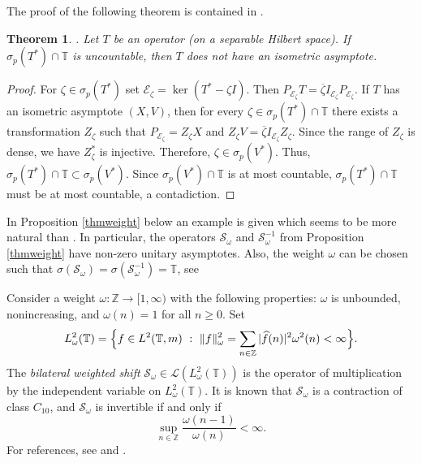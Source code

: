 \documentclass[a4paper,oneside,11pt]{amsart}
\numberwithin{equation}{section}
\theoremstyle{plain}
\newtheorem{theorem}{Theorem}[section]
\theoremstyle{definition}
\begin{document}
The proof of the following theorem  is contained in {\cite[Example 14]{kerntuple}}. 

\begin{theorem}\label{thmeigen}\cite{kerntuple}. Let $T$ be an operator (on a separable Hilbert space). If $\sigma_p(T^*)\cap\mathbb T$ is uncountable, 
then $T$ does not have an isometric asymptote. 
\end{theorem}

\begin{proof} For  $\zeta\in \sigma_p(T^*)$ set $\mathcal E_\zeta=\ker(T^*-\zeta I)$. 
Then $P_{\mathcal E_\zeta} T= \overline\zeta I_{\mathcal E_\zeta}P_{\mathcal E_\zeta}$. If $T$ has an isometric asymptote $(X,V)$, 
then for every $\zeta\in \sigma_p(T^*)\cap\mathbb T$ there exists a transformation $Z_\zeta$ such that 
 $P_{\mathcal E_\zeta}=Z_\zeta X$ and $Z_\zeta V=\overline\zeta I_{\mathcal E_\zeta}Z_\zeta$. Since the range of
 $Z_\zeta$ is dense, 
we have $Z_\zeta^*$ is injective. Therefore, $\zeta\in\sigma_p(V^*)$. Thus, $\sigma_p(T^*)\cap\mathbb T\subset \sigma_p(V^*)$. 
Since 
 $\sigma_p(V^*)\cap\mathbb T$ is at most countable, 
$\sigma_p(T^*)\cap\mathbb T$ 
must be at most countable, a contadiction.
\end{proof}

In Proposition \ref{thmweight} below an example is given which seems to be more natural than 
 {\cite[Example 14]{kerntuple}}. In particular, the operators $ \mathcal S_\omega$ and $\mathcal S_\omega^{-1}$ from Proposition \ref{thmweight} have  non-zero unitary asymptotes. Also, the weight $\omega$ can be chosen such that
 $\sigma( \mathcal S_\omega)=\sigma( \mathcal S_\omega^{-1})=\mathbb T$, see  {\cite[Proposition 2.3]{est}} 

Consider a weight $\omega\colon\mathbb Z \to [1,\infty)$ with the following properties: $\omega$ is unbounded,   nonincreasing,  and  $\omega(n)=1$ for all $n\geq 0$. 
Set $$L^2_\omega(\mathbb T)=\Bigl\{f\in L^2(\mathbb T,m)\ :\ \|f\|^2_\omega=\sum_{n\in\mathbb Z}|\widehat f(n)|^2\omega^2(n)<\infty\Bigr\}.$$
The \emph{bilateral weighted shift}  $\mathcal S_\omega\in\mathcal L(L^2_\omega(\mathbb T))$ is the operator 
of multiplication by the independent variable on $L^2_\omega(\mathbb T)$. 
It is known that $ \mathcal S_\omega$ is a contraction of class $C_{10}$, and $ \mathcal S_\omega$ is invertible if and only if 
\begin{equation}\label{omegainv}\sup_{n\in\mathbb Z}\frac{\omega(n-1)}{\omega(n)}<\infty. \end{equation}
For references, see   {\cite[Sec. 2]{est}} and {\cite[Sec. 7]{kersz}}. 
\end{document}
